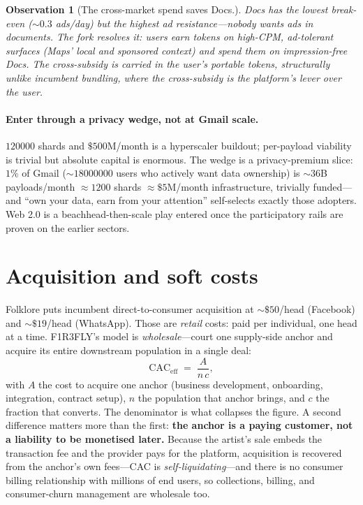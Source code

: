\documentclass[11pt]{article}
\newtheorem{observation}{Observation}
\begin{document}
\begin{observation}[The cross-market spend saves Docs.]
Docs has the lowest break-even (${\sim}0.3$ ads/day) but the highest ad resistance---nobody wants ads in documents. The fork resolves it: users earn tokens on high-CPM, ad-tolerant surfaces (Maps' local and sponsored context) and spend them on impression-free Docs. The cross-subsidy is carried in the \emph{user's} portable tokens, structurally unlike incumbent bundling, where the cross-subsidy is the platform's lever over the user.
\end{observation}

\paragraph{Enter through a privacy wedge, not at Gmail scale.} $\num{120000}$ shards and $\$500$M/month is a hyperscaler buildout; per-payload viability is trivial but absolute capital is enormous. The wedge is a privacy-premium slice: $1\%$ of Gmail (${\sim}\num{18000000}$ users who actively want data ownership) is ${\sim}36$B payloads/month ${\approx}\num{1200}$ shards ${\approx}\$5$M/month infrastructure, trivially funded---and ``own your data, earn from your attention'' self-selects exactly those adopters. Web 2.0 is a beachhead-then-scale play entered once the participatory rails are proven on the earlier sectors.

\section{Acquisition and soft costs}
\label{sec:cac}

Folklore puts incumbent direct-to-consumer acquisition at ${\sim}\$50$/head (Facebook) and ${\sim}\$19$/head (WhatsApp). Those are \emph{retail} costs: paid per individual, one head at a time. F1R3FLY's model is \emph{wholesale}---court one supply-side anchor and acquire its entire downstream population in a single deal:
\[
  \mathrm{CAC}_{\text{eff}} \;=\; \frac{A}{n\,c},
\]
with $A$ the cost to acquire one anchor (business development, onboarding, integration, contract setup), $n$ the population that anchor brings, and $c$ the fraction that converts. The denominator is what collapses the figure. A second difference matters more than the first: \textbf{the anchor is a paying customer, not a liability to be monetised later.} Because the artist's sale embeds the transaction fee and the provider pays for the platform, acquisition is recovered from the anchor's own fees---CAC is \emph{self-liquidating}---and there is no consumer billing relationship with millions of end users, so collections, billing, and consumer-churn management are wholesale too.
\end{document}
